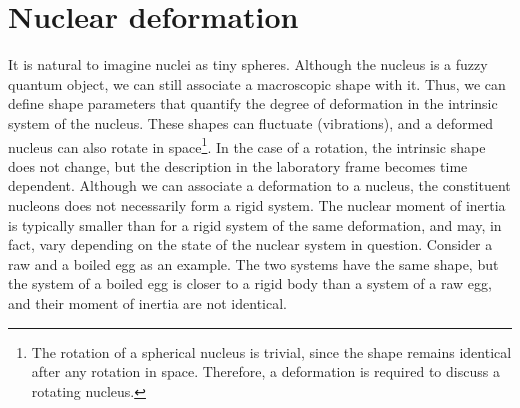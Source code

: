 \documentclass[twoside,english]{uiofysmaster/uiofysmaster}
\begin{document}
\section{Nuclear deformation}\label{sec:deformation}
It is natural to imagine nuclei as tiny spheres.
Although the nucleus is a fuzzy quantum object, we can still associate a macroscopic shape with it.
Thus, we can define shape parameters that quantify the degree of deformation in the intrinsic system of the nucleus. 
These shapes can fluctuate (vibrations), and a deformed nucleus can also rotate in space\footnote{The rotation of a spherical nucleus is trivial, since the shape remains identical after any rotation in space. Therefore, a deformation is required to discuss a rotating nucleus.}.
In the case of a rotation, the intrinsic shape does not change, but the description in the laboratory frame becomes time dependent. 
Although we can associate a deformation to a nucleus, the constituent nucleons does not necessarily form a rigid system. 
The nuclear moment of inertia is typically smaller than for a rigid system of the same deformation, and may, in fact, vary depending on the state of the nuclear system in question.  
Consider a raw and a boiled egg as an example. 
The two systems have the same shape, but the system of a boiled egg is closer to a rigid body than a system of a raw egg, and their moment of inertia are not identical.
\end{document}
